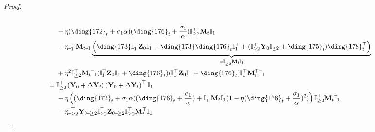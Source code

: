 \documentclass{article}
\theoremstyle{plain}
\theoremstyle{remark}
\def\bY{\mathbf{Y}}
\def\bZ{\mathbf{Z}}
\newcommand{\cc}[1]{\text{\ding{\number\numexpr#1 + 171\relax}}}
\begin{document}
\begin{proof}
\begin{align*}
        \\
        &~~~~
            -\eta(\cc{1}_t+\sigma_1\alpha)(\cc{5}_t+\frac{\sigma_1}{\alpha})\mathbb{I}_{\ge2}^\top\mathbf{M}_t\mathbb{I}_{1}
        \\
        &~~~~
            -\eta\mathbb{I}_{1}^\top\mathbf{M}_t\mathbb{I}_{1}\underbrace{\left( \cc{2}\mathbb{I}_{1}^\top\bZ_0\mathbb{I}_{1} + \cc{2}\cc{5}_t\mathbb{I}_{1}^\top + (\mathbb{I}_{\ge2}^\top\bY_0\mathbb{I}_{\ge2}+\cc{4}_t)\cc{7}_t^\top \right)}_{=\mathbb{I}_{\ge2}^\top\mathbf{M}_t\mathbb{I}_{1}}
        \\
        &~~~~
            +\eta^2\mathbb{I}_{\ge2}^\top\mathbf{M}_t\mathbb{I}_{1}
            ( \mathbb{I}_{1}^\top\bZ_0\mathbb{I}_{1} + \cc{5}_t)
            ( \mathbb{I}_{1}^\top\bZ_0\mathbb{I}_{1} + \cc{5}_t)
            \mathbb{I}_{1}^\top\mathbf{M}_t^\top\mathbb{I}_{1}
        \\
        &=
            \mathbb{I}_{\ge2}^\top\left(\bY_0+\Delta\bY_t\right)\left(\bY_0+\Delta\bY_t\right)^\top\mathbb{I}_{1}
            \\
            &~~~~
                -\eta\left((\cc{1}_t+\sigma_1\alpha)(\cc{5}_t+\frac{\sigma_1}{\alpha})+\mathbb{I}_{1}^\top\mathbf{M}_t\mathbb{I}_{1}(1-\eta(\cc{5}_t+\frac{\sigma_1}{\alpha})^2)\right)\mathbb{I}_{\ge2}^\top\mathbf{M}_t\mathbb{I}_{1}
            \\
            &~~~~
                -\eta\mathbb{I}_{\ge2}^\top\bY_0\mathbb{I}_{\ge2}\mathbb{I}_{\ge2}^\top\bZ_0\mathbb{I}_{\ge2}\mathbb{I}_{\ge2}^\top\mathbf{M}_t^\top\mathbb{I}_{1}
    \end{align*}


\end{proof}
\end{document}
